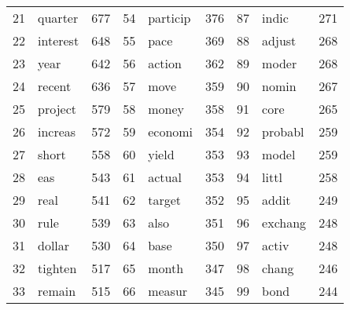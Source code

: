 \begin{tabular}{rlrrlrrlr}
 21 &   quarter &    677 &  54 &   particip &    376 &  87 &    indic &    271 \\
 22 &  interest &    648 &  55 &       pace &    369 &  88 &   adjust &    268 \\
 23 &      year &    642 &  56 &     action &    362 &  89 &    moder &    268 \\
 24 &    recent &    636 &  57 &       move &    359 &  90 &    nomin &    267 \\
 25 &   project &    579 &  58 &      money &    358 &  91 &     core &    265 \\
 26 &   increas &    572 &  59 &    economi &    354 &  92 &  probabl &    259 \\
 27 &     short &    558 &  60 &      yield &    353 &  93 &    model &    259 \\
 28 &       eas &    543 &  61 &     actual &    353 &  94 &    littl &    258 \\
 29 &      real &    541 &  62 &     target &    352 &  95 &    addit &    249 \\
 30 &      rule &    539 &  63 &       also &    351 &  96 &  exchang &    248 \\
 31 &    dollar &    530 &  64 &       base &    350 &  97 &    activ &    248 \\
 32 &   tighten &    517 &  65 &      month &    347 &  98 &    chang &    246 \\
 33 &    remain &    515 &  66 &     measur &    345 &  99 &     bond &    244 \\
\bottomrule
\end{tabular}
